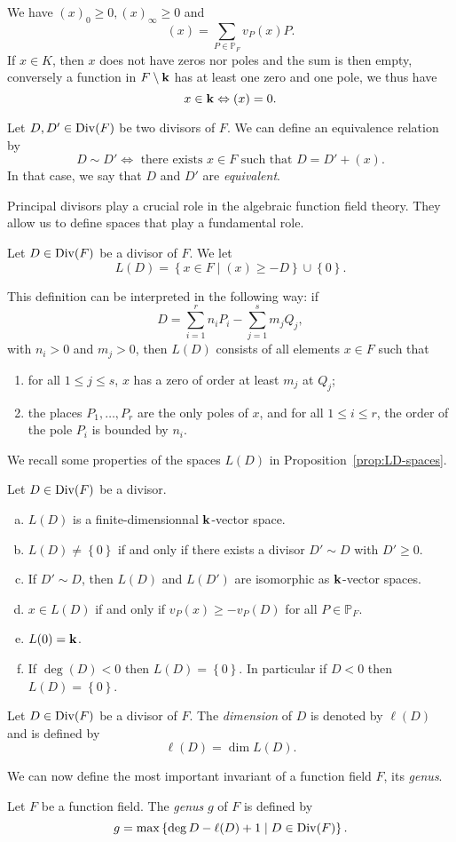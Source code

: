 We have $(x)_0\geq0, (x)_\infty\geq0$ and
\[
  (x) = \sum_{P\in\mathbb{P}_F}v_P(x)P.
\]
If $x\in K$, then $x$ does not have zeros nor poles and the sum is then empty,
conversely a function in $F\setminus\mathbf{k}$ has at least one zero and one pole, we
thus have
\[
  x\in\mathbf{k}\Leftrightarrow (x)=0.
\]
\begin{defi}[Equivalence]
  Let $D, D'\in\operatorname{Div}(F)$ be two divisors of $F$. We can define an equivalence
  relation by
  \[
    D\sim D'\Longleftrightarrow\text{ there exists }x\in F\text{ such that }D =
    D'+(x).
  \]
  In that case, we say that $D$ and $D'$ are \emph{equivalent}.
\end{defi}
Principal divisors play a crucial role in the algebraic function field theory.
They allow us to define spaces that play a fundamental role.
\begin{defi}
  Let $D\in\operatorname{Div}(F)$ be a divisor of $F$. We let
  \[
    L(D) = \left\{ x\in F\mid(x)\geq -D \right\}\cup\left\{ 0 \right\}.
  \]
\end{defi}
This definition can be interpreted in the following way: if
\[
  D = \sum_{i=1}^rn_iP_i - \sum_{j=1}^sm_jQ_j,
\]
with $n_i>0$ and $m_j>0$, then $L(D)$ consists of all elements $x\in F$ such
that
\begin{enumerate}
  \item for all $1\leq j\leq s$, $x$ has a zero of order at least $m_j$ at $Q_j$;
  \item the places $P_1, \dots, P_r$ are the only poles of $x$, and for all
    $1\leq i\leq r$, the order of the pole $P_i$ is bounded by $n_i$.
\end{enumerate}
We recall some properties of the spaces $L(D)$ in
Proposition~\ref{prop:LD-spaces}.
\begin{prop}
  \label{prop:LD-spaces}
 Let $D\in\operatorname{Div}(F)$ be a divisor.
 \begin{enumerate}[(a)]
   \item $L(D)$ is a finite-dimensionnal $\mathbf{k}$-vector space.
   \item $L(D)\neq\left\{ 0 \right\}$ if and only if there exists a divisor
     $D'\sim D$ with $D'\geq0$.
   \item If $D'\sim D$, then $L(D)$ and $L(D')$ are isomorphic as $\mathbf{k}$-vector
     spaces.
   \item $x\in L(D)$ if and only if $v_P(x)\geq - v_P(D)$ for all
     $P\in\mathbb{P}_F$.
   \item $L(0)=\mathbf{k}$.
   \item If $\deg(D)<0$ then $L(D)=\left\{ 0 \right\}$. In particular if $D<0$
     then $L(D)=\left\{ 0 \right\}$.
 \end{enumerate}
\end{prop}
\begin{defi}[Dimension]
  Let $D\in\operatorname{Div}(F)$ be a divisor of $F$. The \emph{dimension} of $D$ is denoted
  by $\ell(D)$ and is defined by
  \[
    \ell(D) = \dim L(D).
  \]
\end{defi}
We can now define the most important invariant of a function field $F$, its
\emph{genus}.
\begin{defi}
  Let $F$ be a function field. The \emph{genus} $g$ of $F$ is defined by
  \[
    g = \max\left\{ \deg D-\ell(D)+1\mid D\in\operatorname{Div}(F) \right\}.
  \]
\end{defi}

